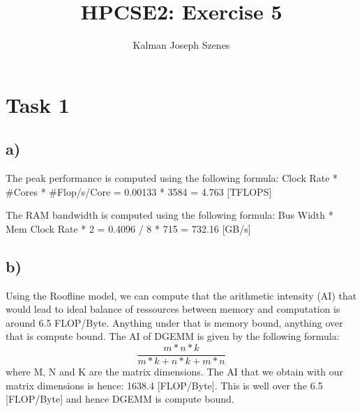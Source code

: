 \documentclass{article}
\author{Kalman Joseph Szenes}
\title{HPCSE2: Exercise 5}
\begin{document}
    \maketitle

    \section{Task 1}
    \subsection{a)}
    The peak performance is computed using the following formula: Clock Rate * \#Cores * \#Flop/s/Core = 0.00133 * 3584 = 4.763 [TFLOPS]


    The RAM bandwidth is computed using the following formula: Bus Width * Mem Clock Rate * 2 = 0.4096 / 8 * 715 = 732.16 [GB/s]

    \subsection{b)}
    Using the Roofline model, we can compute that the arithmetic intensity (AI) that would lead to ideal balance of ressources between memory and computation is around 6.5 FLOP/Byte.
    Anything under that is memory bound, anything over that is compute bound.
    The AI of DGEMM is given by the following formula: 
    \[
        \frac{m * n * k}{m * k + n * k + m * n}
    \] where M, N and K are the matrix dimensions.
    The AI that we obtain with our matrix dimensions is hence: 1638.4 [FLOP/Byte]. 
    This is well over the 6.5 [FLOP/Byte] and hence DGEMM is compute bound.

    
\end{document}
